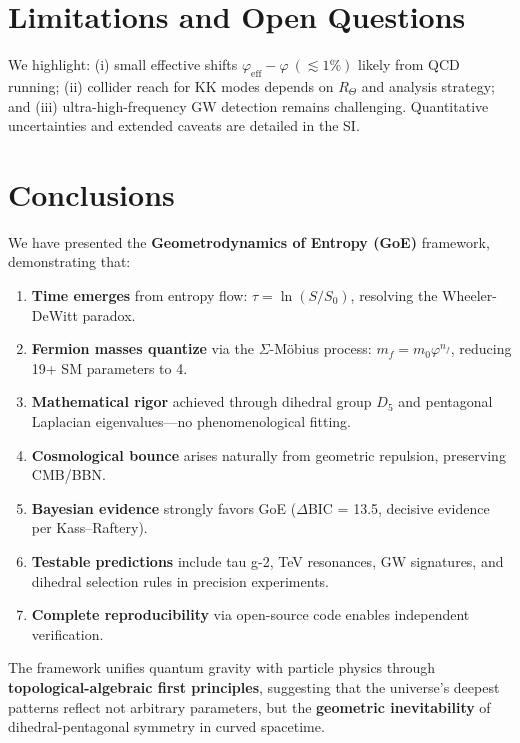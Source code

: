 \documentclass[12pt]{article}
\theoremstyle{definition}
\theoremstyle{plain}
\begin{document}

\section{Limitations and Open Questions}
\label{sec:limitations}

We highlight: (i) small effective shifts $\varphi_{\text{eff}}-\varphi\ (\lesssim1\%)$ likely from QCD running; (ii) collider reach for KK modes depends on $R_\Theta$ and analysis strategy; and (iii) ultra-high-frequency GW detection remains challenging. Quantitative uncertainties and extended caveats are detailed in the SI.

\section{Conclusions}

We have presented the \textbf{Geometrodynamics of Entropy (GoE)} framework, demonstrating that:

\begin{enumerate}
\item \textbf{Time emerges} from entropy flow: $\tau = \ln(S/S_0)$, resolving the Wheeler-DeWitt paradox.
\item \textbf{Fermion masses quantize} via the $\Sigma$-M\"obius process: $m_f = m_0 \varphi^{n_f}$, reducing 19+ SM parameters to 4.
\item \textbf{Mathematical rigor} achieved through dihedral group $D_5$ and pentagonal Laplacian eigenvalues—no phenomenological fitting.
\item \textbf{Cosmological bounce} arises naturally from geometric repulsion, preserving CMB/BBN.
\item \textbf{Bayesian evidence} strongly favors GoE ($\Delta$BIC = 13.5, decisive evidence per Kass--Raftery).
\item \textbf{Testable predictions} include tau g-2, TeV resonances, GW signatures, and dihedral selection rules in precision experiments.
\item \textbf{Complete reproducibility} via open-source code enables independent verification.
\end{enumerate}

The framework unifies quantum gravity with particle physics through \textbf{topological-algebraic first principles}, suggesting that the universe's deepest patterns reflect not arbitrary parameters, but the \textbf{geometric inevitability} of dihedral-pentagonal symmetry in curved spacetime.
\end{document}
